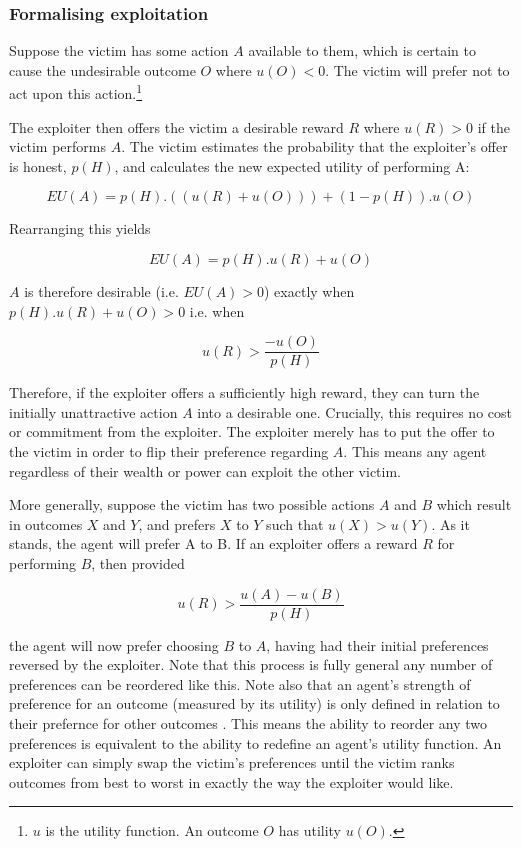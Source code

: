 \documentclass{article}
\begin{document}
\subsubsection{Formalising exploitation}

Suppose the victim has some action \(A\) available to them, which is certain to cause the undesirable outcome \(O\) where \(u(O) < 0\). The victim will prefer not to act upon this action.\footnote{\(u\) is the utility function. An outcome \(O\) has utility \(u(O)\).}

The exploiter then offers the victim a desirable reward \(R\) where \(u(R) > 0\) if the victim performs \(A\). The victim estimates the probability that the exploiter's offer is honest, \(p(H)\), and calculates the new expected utility of performing A:

\[EU(A) = p(H).((u(R)+u(O))) + (1-p(H)).u(O)\]

\noindent
Rearranging this yields

\[EU(A) = p(H).u(R) + u(O)\]

\noindent
\(A\) is therefore desirable (i.e. \(EU(A)>0\)) exactly when \(p(H).u(R) + u(O) > 0\) i.e. when

\[u(R) > \frac{-u(O)}{p(H)}\]

\noindent
Therefore, if the exploiter offers a sufficiently high reward, they can turn the initially unattractive action \(A\) into a desirable one. Crucially, this requires no cost or commitment from the exploiter. The exploiter merely has to put the offer to the victim in order to flip their preference regarding \(A\). This means any agent regardless of their wealth or power can exploit the other victim.

More generally, suppose the victim has two possible actions \(A\) and \(B\) which result in outcomes \(X\) and \(Y\), and prefers \(X\) to \(Y\) such that \(u(X)>u(Y)\). As it stands, the agent will prefer A to B. If an exploiter offers a reward \(R\) for performing \(B\), then provided

\[u(R) > \frac{u(A)-u(B)}{p(H)}\]

\noindent
the agent will now prefer choosing \(B\) to \(A\), having had their initial preferences reversed by the exploiter. Note that this process is fully general \textemdash{} any number of preferences can be reordered like this. Note also that an agent's strength of preference for an outcome (measured by its utility) is only defined in relation to their prefernce for other outcomes \citep{von1944games}. This means the ability to reorder any two preferences is equivalent to the ability to redefine an agent's utility function. An exploiter can simply swap the victim's preferences until the victim ranks outcomes from best to worst in exactly the way the exploiter would like.
\end{document}
